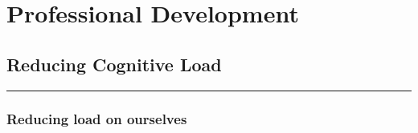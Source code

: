 \documentclass[
  letterpaper,
  DIV=11,
  numbers=noendperiod]{scrreprt}
\begin{document}
\part{Professional Development}

\hypertarget{reducing-cognitive-load}{%
\chapter{Reducing Cognitive Load}\label{reducing-cognitive-load}}

\begin{center}\rule{0.5\linewidth}{0.5pt}\end{center}

\hypertarget{reducing-load-on-ourselves}{%
\section*{\texorpdfstring{\textbf{Reducing load on
ourselves}}{Reducing load on ourselves}}\label{reducing-load-on-ourselves}}

\end{document}
